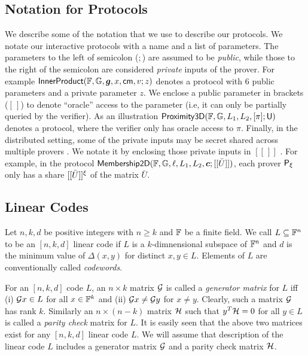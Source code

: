 \subsection{Notation for Protocols}
We describe some of the notation that we use to describe our protocols. We
notate our interactive protocols with a name and a list of parameters. The
parameters to the left of semicolon ($;$) are assumed to be {\em public}, while those to the
right of the semicolon are considered {\em private} inputs of the prover. For example
$\mathsf{InnerProduct}(\mathbb{F},\mathbb{G},\bm{g},x,\mathsf{cm},v;z)$ denotes a protocol with $6$
public parameters and a private parameter $z$. We enclose a public parameter in
brackets ($[\,]$) to denote ``oracle'' access to the parameter (i.e, it can only
be partially queried by the verifier). As an illustration
$\mathsf{Proximity3D}(\mathbb{F},\mathbb{G},L_1,L_2,[\pi];\mathsf{U})$ denotes a protocol, where the
verifier only has oracle access to $\pi$. Finally, in the distributed setting,
some of the private inputs may be secret shared  across multiple provers . We notate it
by enclosing those private inputs in $[[\,]]$ . For example, in the protocol
$\mathsf{Membership2D}(\mathbb{F},\mathbb{G},\ell,L_1,L_2,\bm{c};[[\bar{U}]])$, each prover
$\mathsf{P}_\xi$ only has a share $[[{\bar{U}}]]^\xi$ of the matrix $\bar{U}$.

\subsection{Linear Codes}
\begin{definition}\label{defn:lincode}
Let $n,k,d$ be positive integers with $n\geq k$ and $\mathbb{F}$ be a finite field. We
call $L\subseteq \mathbb{F}^n$ to be an $[n,k,d]$ linear code if $L$ is a $k$-dimnensional
subspace of $\mathbb{F}^n$ and $d$ is the minimum value of $\Delta(x,y)$ for distinct
$x,y\in L$. Elements of $L$ are conventionally called {\em codewords}.
\end{definition}

For an $[n,k,d]$ code $L$, an $n\times k$ matrix $\mathcal{G}$ is called a {\em
generator matrix} for $L$ iff (i) $\mathcal{G} x\in L$ for all $x \in \mathbb{F}^k$ and (ii)
$\mathcal{G} x\neq \mathcal{G} y$ for $x\neq y$. Clearly, such a matrix $\mathcal{G}$ has rank
$k$. Similarly an $n\times (n-k)$ matrix $\mathcal{H}$ such that $y^T \mathcal{H} = 0$ for
all $y\in L$ is called a {\em parity check} matrix for $L$. It is easily seen
that the above two matrices exist for any $[n,k,d]$ linear code $L$. We will
assume that description of the linear code $L$ includes a generator matrix
$\mathcal{G}$ and a parity check matrix $\mathcal{H}$.

